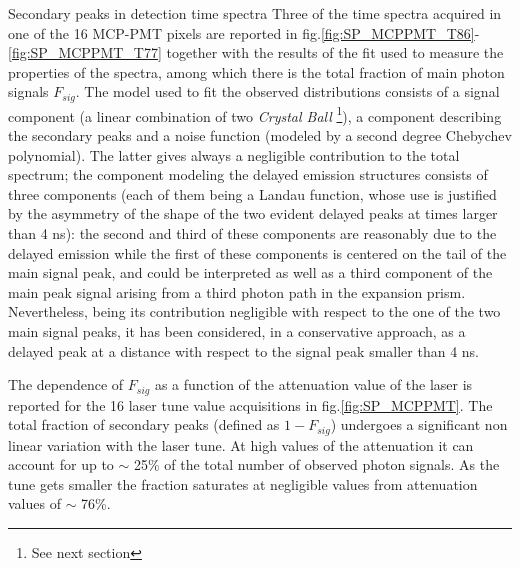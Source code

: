 \documentclass[a4paper,11pt]{article}
\begin{document}
\begin{subsection}{Secondary peaks in detection time spectra}
Three of the time spectra acquired in one of the 16 MCP-PMT pixels are reported in fig.\ref{fig:SP_MCPPMT_T86}-\ref{fig:SP_MCPPMT_T77} together with the results of the fit used to measure the properties of the spectra, among which there is the total fraction of main photon signals $F_{sig}$. The model used to fit the observed distributions consists of a signal component (a linear combination of two {\it Crystal Ball} \footnote{See next section}), a component describing the secondary peaks and a noise function (modeled by a second degree Chebychev polynomial). The latter gives always a negligible contribution to the total spectrum; the component modeling the delayed emission structures consists of three components (each of them being a Landau function, whose use is justified by the asymmetry of the shape of the two evident delayed peaks at times larger than 4 ns): the second and third of these components are reasonably due to the delayed emission while the first of these components is centered on the tail of the main signal peak, and could be interpreted as well as a third component of the main peak signal arising from a third photon path in the expansion prism. Nevertheless, being its contribution negligible with respect to the one of the two main signal peaks, it has been considered, in a conservative approach, as a delayed peak at a distance with respect to the signal peak smaller than 4 ns.

The dependence of $F_{sig}$ as a function of the attenuation value of the laser is reported for the 16 laser tune value acquisitions in fig.\ref{fig:SP_MCPPMT}. The total fraction of secondary peaks (defined as $1-F_{sig}$) undergoes a significant non linear variation with the laser tune. At high values of the attenuation it can account for up to $\sim$ 25\% of the total number of observed photon signals. As the tune gets smaller the fraction saturates at negligible values from attenuation values of $\sim$ 76\%.



\end{subsection}
\end{document}
